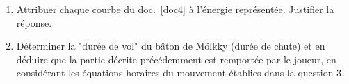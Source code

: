 \documentclass[a4paper,11pt,fleqn]{scrartcl}%
\begin{document}
\begin{enumerate}[resume]
    \item Attribuer chaque courbe du doc.~\ref{doc4} à l'énergie représentée. Justifier la réponse.
    \item Déterminer la "durée de vol" du bâton de Mölkky (durée de chute) et en déduire que la partie décrite précédemment est remportée par le joueur, en considérant les équations horaires du mouvement établies dans la question 3.
\end{enumerate}
\end{document}
